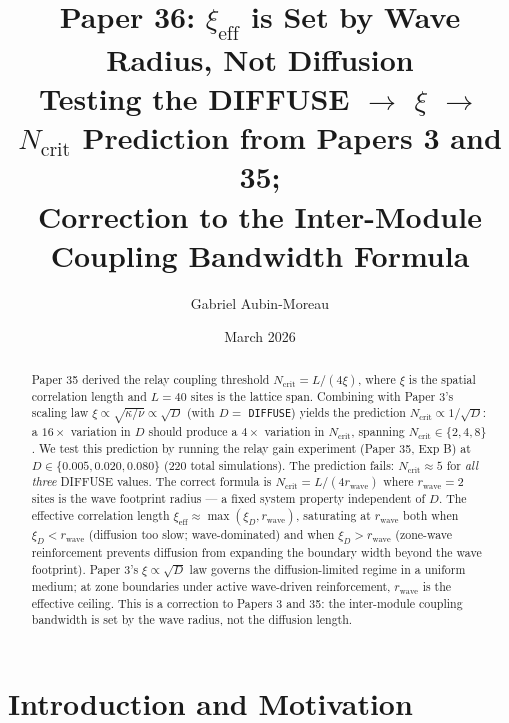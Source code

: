 \documentclass[11pt]{article}
\title{\textbf{Paper 36: $\xi_{\mathrm{eff}}$ is Set by Wave Radius, Not Diffusion}\\
\large Testing the DIFFUSE $\to$ $\xi$ $\to$ $N_{\mathrm{crit}}$ Prediction from Papers 3 and 35;\\
Correction to the Inter-Module Coupling Bandwidth Formula}
\author{Gabriel Aubin-Moreau}
\date{March 2026}
\begin{document}
\maketitle

\begin{abstract}
Paper 35 derived the relay coupling threshold $N_{\mathrm{crit}} = L/(4\xi)$, where
$\xi$ is the spatial correlation length and $L = 40$ sites is the lattice span.
Combining with Paper 3's scaling law $\xi \propto \sqrt{\kappa/\nu} \propto \sqrt{D}$
(with $D = $ \texttt{DIFFUSE}) yields the prediction
$N_{\mathrm{crit}} \propto 1/\sqrt{D}$:
a $16\times$ variation in $D$ should produce a $4\times$ variation in $N_{\mathrm{crit}}$,
spanning $N_{\mathrm{crit}} \in \{2, 4, 8\}$.
We test this prediction by running the relay gain experiment (Paper 35, Exp B)
at $D \in \{0.005, 0.020, 0.080\}$ (220 total simulations).
The prediction fails: $N_{\mathrm{crit}} \approx 5$ for \emph{all three} DIFFUSE values.
The correct formula is $N_{\mathrm{crit}} = L / (4 r_{\mathrm{wave}})$ where
$r_{\mathrm{wave}} = 2$ sites is the wave footprint radius --- a fixed system
property independent of $D$.
The effective correlation length $\xi_{\mathrm{eff}} \approx \max(\xi_D, r_{\mathrm{wave}})$,
saturating at $r_{\mathrm{wave}}$ both when $\xi_D < r_{\mathrm{wave}}$
(diffusion too slow; wave-dominated) and when $\xi_D > r_{\mathrm{wave}}$
(zone-wave reinforcement prevents diffusion from expanding the boundary width
beyond the wave footprint). Paper 3's $\xi \propto \sqrt{D}$ law governs the
diffusion-limited regime in a uniform medium; at zone boundaries under active
wave-driven reinforcement, $r_{\mathrm{wave}}$ is the effective ceiling.
This is a correction to Papers 3 and 35: the inter-module coupling bandwidth
is set by the wave radius, not the diffusion length.
\end{abstract}

\section{Introduction and Motivation}
\end{document}
